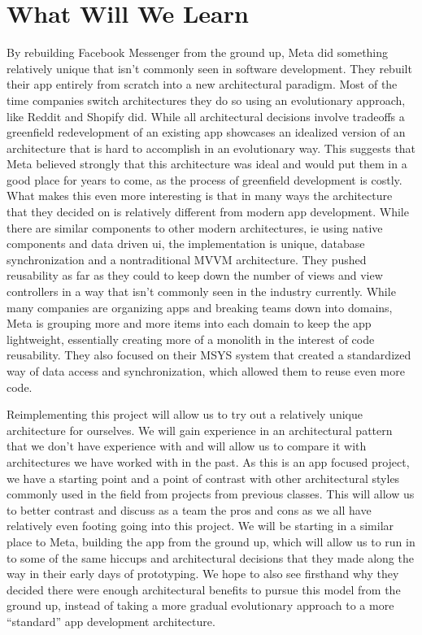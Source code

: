 \documentclass[12pt]{article}
\begin{document}

    \section{What Will We Learn}
    By rebuilding Facebook Messenger from the ground up, Meta did something relatively unique that isn’t commonly seen in software development. They rebuilt their app entirely from scratch into a new architectural paradigm. Most of the time companies switch architectures they do so using an evolutionary approach, like Reddit and Shopify did. While all architectural decisions involve tradeoffs a greenfield redevelopment of an existing app showcases an idealized version of an architecture that is hard to accomplish in an evolutionary way. This suggests that Meta believed strongly that this architecture was ideal and would put them in a good place for years to come, as the process of greenfield development is costly. What makes this even more interesting is that in many ways the architecture that they decided on is relatively different from modern app development. While there are similar components to other modern architectures, ie using native components and data driven ui, the implementation is unique, database synchronization and a nontraditional MVVM architecture. They pushed reusability as far as they could to keep down the number of views and view controllers in a way that isn’t commonly seen in the industry currently. While many companies are organizing apps and breaking teams down into domains, Meta is grouping more and more items into each domain to keep the app lightweight, essentially creating more of a monolith in the interest of code reusability. They also focused on their MSYS system that created a standardized way of data access and synchronization, which allowed them to reuse even more code.

    Reimplementing this project will allow us to try out a relatively unique architecture for ourselves. We will gain experience in an architectural pattern that we don’t have experience with and will allow us to compare it with architectures we have worked with in the past. As this is an app focused project, we have a starting point and a point of contrast with other architectural styles commonly used in the field from projects from previous classes. This will allow us to better contrast and discuss as a team the pros and cons as we all have relatively even footing going into this project. We will be starting in a similar place to Meta, building the app from the ground up, which will allow us to run in to some of the same hiccups and architectural decisions that they made along the way in their early days of prototyping. We hope to also see firsthand why they decided there were enough architectural benefits to pursue this model from the ground up, instead of taking a more gradual evolutionary approach to a more “standard” app development architecture.


\end{document}
